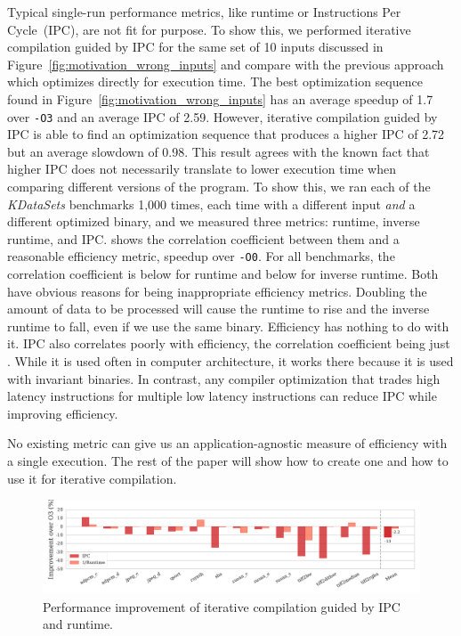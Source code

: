     Typical single-run performance metrics, like runtime or Instructions Per Cycle~(IPC), are not fit for purpose.
    To show this, we performed iterative compilation guided by IPC for the same set of 10 inputs
    discussed in Figure~\ref{fig:motivation_wrong_inputs} and compare with the previous approach which optimizes directly for execution time.
    The best optimization sequence found in Figure~\ref{fig:motivation_wrong_inputs}
    has an average speedup of 1.7 over \texttt{-O3} and an average IPC of 2.59.
    However, iterative compilation guided by IPC is able to find an optimization
    sequence that produces a higher IPC of 2.72 but an average slowdown of 0.98.
    This result agrees with the known fact that higher IPC does not necessarily translate to lower execution time when comparing different versions of the program.
    To show this, we ran
    each of the  \textit{KDataSets} benchmarks 1,000 times, each time with a different input \textit{and} a different optimized
    binary, and we measured three metrics: runtime, inverse runtime, and IPC.  shows the correlation coefficient between
    them and a reasonable efficiency metric, speedup over \texttt{-O0}. For all benchmarks, the correlation coefficient is below
     for runtime and below  for inverse runtime. Both have obvious reasons for being inappropriate efficiency
    metrics. Doubling the amount of data to be processed will cause the runtime to rise and the inverse runtime to fall, even if we use the same binary.
    Efficiency has nothing to do with it. IPC also correlates poorly with efficiency, the correlation coefficient being just .
    While it is used often in computer architecture, it works there because it is used with invariant binaries. In contrast, any compiler
    optimization that trades high latency instructions for multiple low latency instructions can reduce IPC while improving efficiency.
    
    No existing metric can give us an application-agnostic measure of efficiency with a single execution. The rest of the paper will show
    how to create one and how to use it for iterative compilation. 


\begin{figure}[t]
    \centering
    \includegraphics[width=\textwidth]{figs/motivation-speedups.pdf}
    \caption{ Performance improvement of iterative compilation guided by IPC and runtime.}
    \label{fig:motivation-speedups}
\end{figure}

